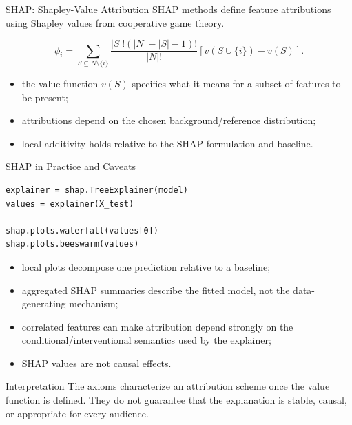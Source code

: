 \begin{frame}{SHAP: Shapley-Value Attribution}
SHAP methods define feature attributions using Shapley values from cooperative game theory.

\[
\phi_i = \sum_{S\subseteq N\setminus\{i\}}
\frac{|S|!(|N|-|S|-1)!}{|N|!}
\left[v(S\cup\{i\})-v(S)\right].
\]

\begin{itemize}
  \item the value function $v(S)$ specifies what it means for a subset of features to be present;
  \item attributions depend on the chosen background/reference distribution;
  \item local additivity holds relative to the SHAP formulation and baseline.
\end{itemize}
\end{frame}

\begin{frame}[fragile]{SHAP in Practice and Caveats}
\begin{lstlisting}[style=code,basicstyle=\ttfamily\small]
explainer = shap.TreeExplainer(model)
values = explainer(X_test)

shap.plots.waterfall(values[0])
shap.plots.beeswarm(values)
\end{lstlisting}

\begin{itemize}
  \item local plots decompose one prediction relative to a baseline;
  \item aggregated SHAP summaries describe the fitted model, not the data-generating mechanism;
  \item correlated features can make attribution depend strongly on the conditional/interventional semantics used by the explainer;
  \item SHAP values are not causal effects.
\end{itemize}

\begin{alertblock}{Interpretation}
The axioms characterize an attribution scheme once the value function is defined. They do not guarantee that the explanation is stable, causal, or appropriate for every audience.
\end{alertblock}
\end{frame}

